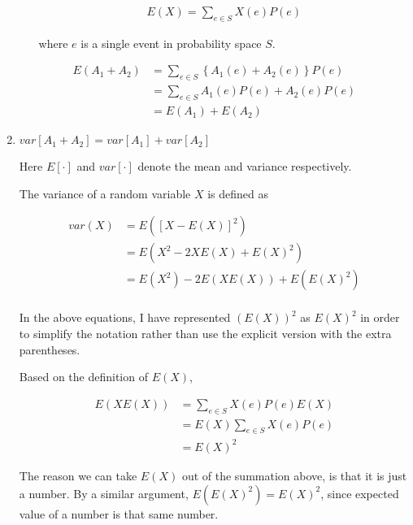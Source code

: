 \begin{enumerate}
\begin{enumerate}
\begin{equation*}
\begin{aligned}
E(X) = \sum_{e \in S} X(e) P(e)
\end{aligned}
\end{equation*} 

where $e$ is a single event in probability space $S$.
\end{enumerate}


\begin{equation*}
\begin{aligned}
E(A_1 + A_2) &= \sum_{e \in S} \left \{A_1(e) + A_2(e) \right \} P(e)\\
&= \sum_{e \in S} A_1(e) P(e)+ A_2(e) P(e)\\
&= E(A_1)  + E(A_2) 
\end{aligned}
\end{equation*}

  \item $var[A_1 + A_2] = var[A_1] + var[A_2]$
  
  Here $E[\cdot]$ and $var[\cdot]$ denote the mean and variance
  respectively.
  
The variance of a random variable $X$ is defined as 

\begin{equation*}
\begin{aligned}
var(X) &= E(\left[X-E(X)\right]^2)\\
&= E(X^2-2XE(X) + E(X)^2)\\
&= E(X^2) - 2E(XE(X)) + E(E(X)^2)\\
\end{aligned}
\end{equation*} 

In the above equations, I have represented $(E(X))^2$ as $E(X)^2$ in order to simplify the notation rather than use the explicit version with the extra parentheses. 

Based on the definition of $E(X)$,

 \begin{equation*}
\begin{aligned}
E(XE(X)) &= \sum_{e \in S} X(e) P(e) E(X)\\
&= E(X)\sum_{e \in S} X(e) P(e)\\
&= E(X)^2
\end{aligned}
\end{equation*} 

The reason we can take $E(X)$ out of the summation above, is that it is just a number. By a similar argument, $E(E(X)^2) = E(X)^2$, since expected value of a number is that same number.


\end{enumerate}
